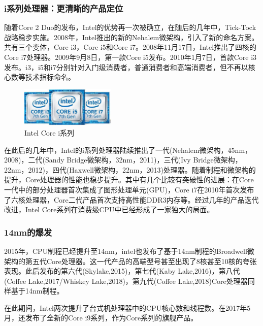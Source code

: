 \documentclass[UTF8]{ctexart}
\begin{document}
\subsubsection{i系列处理器：更清晰的产品定位}
随着Core 2 Duo的发布，Intel的优势再一次被确立，在随后的几年中，Tick-Tock战略稳步实施。2008年，Intel推出的新的Nehalem微架构，引入了新的命名方案。共有三个变体，Core i3，Core i5和Core i7。2008年11月17日，Intel推出了四核的Core i7处理器。2009年9月8日，第一款Core i5发布。2010年1月7日，首款Core i3发布。i3，i5和i7分别针对入门级消费者，普通消费者和高端消费者，但不再以核心数等技术指标命名。
\begin{figure}[H]
    \begin{center}
        \includegraphics[width=0.4\textwidth]{figure/core1.jpg}
        \caption{Intel Core i系列}
    \end{center}
\end{figure}

在此后的几年中，Intel的i系列处理器陆续推出了一代(Nehalem微架构，45nm，2008)，二代(Sandy Bridge微架构，32nm，2011)，三代(Ivy Bridge微架构，22nm，2012)，四代(Haxwell微架构，22nm，2013)处理器。随着制程和微架构的提升，Core处理器的性能也稳步提升。其中有几个比较有突破性的进展：在Core一代中的部分处理器首次集成了图形处理单元(GPU)，Core i7在2010年首次发布了六核处理器，Core二代产品首次支持高性能DDR3内存等。经过几年的产品迭代改进，Intel Core系列在消费级CPU中已经形成了一家独大的局面。

\subsubsection{14nm的爆发}
2015年，CPU制程已经提升至14nm，intel也发布了基于14nm制程的Broadwell微架构的第五代Core处理器。这一代产品的高端型号甚至出现了8核甚至10核的夸张表现。此后发布的第六代(Skylake,2015)，第七代(Kaby Lake,2016)，第八代(Coffee Lake,2017/Whiskey Lake,2018)，第九代(Coffee Lake,2018)Core处理器同样基于14nm制程。

在此期间，Intel两次提升了台式机处理器中的CPU核心数和线程数。在2017年5月，还发布了全新的Core i9系列，作为Core系列的旗舰产品。
\begin{figure}[H]
    \centering
\end{figure}
\end{document}
